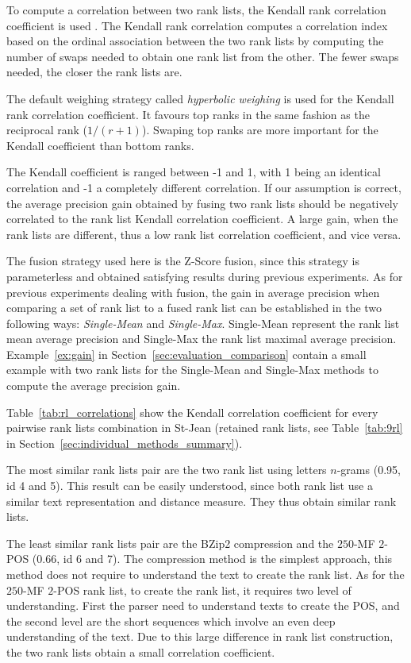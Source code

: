 To compute a correlation between two rank lists, the Kendall rank correlation coefficient is used \cite{scipy}.
The Kendall rank correlation computes a correlation index based on the ordinal association between the two rank lists by computing the number of swaps needed to obtain one rank list from the other.
The fewer swaps needed, the closer the rank lists are.

The default weighing strategy called \textit{hyperbolic weighing} is used for the Kendall rank correlation coefficient.
It favours top ranks in the same fashion as the reciprocal rank ($1 / (r + 1)$).
Swaping top ranks are more important for the Kendall coefficient than bottom ranks.

The Kendall coefficient is ranged between -1 and 1, with 1 being an identical correlation and -1 a completely different correlation.
If our assumption is correct, the average precision gain obtained by fusing two rank lists should be negatively correlated to the rank list Kendall correlation coefficient.
A large gain, when the rank lists are different, thus a low rank list correlation coefficient, and vice versa.

The fusion strategy used here is the Z-Score fusion, since this strategy is parameterless and obtained satisfying results during previous experiments.
As for previous experiments dealing with fusion, the gain in average precision when comparing a set of rank list to a fused rank list can be established in the two following ways: \textit{Single-Mean} and \textit{Single-Max}.
Single-Mean represent the rank list mean average precision and Single-Max the rank list maximal average precision.
Example~\ref{ex:gain} in Section~\ref{sec:evaluation_comparison} contain a small example with two rank lists for the Single-Mean and Single-Max methods to compute the average precision gain.

Table~\ref{tab:rl_correlations} show the Kendall correlation coefficient for every pairwise rank lists combination in St-Jean (retained rank lists, see Table~\ref{tab:9rl} in Section~\ref{sec:individual_methods_summary}).

The most similar rank lists pair are the two rank list using letters $n$-grams (0.95, id 4 and 5).
This result can be easily understood, since both rank list use a similar text representation and distance measure.
They thus obtain similar rank lists.

The least similar rank lists pair are the BZip2 compression and the $250$-MF $2$-POS (0.66, id 6 and 7).
The compression method is the simplest approach, this method does not require to understand the text to create the rank list.
As for the $250$-MF $2$-POS rank list, to create the rank list, it requires two level of understanding.
First the parser need to understand texts to create the POS, and the second level are the short sequences which involve an even deep understanding of the text.
Due to this large difference in rank list construction, the two rank lists obtain a small correlation coefficient.

